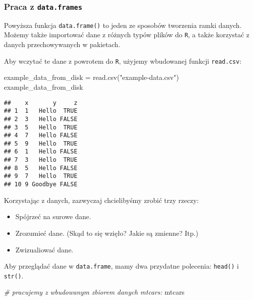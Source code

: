 \documentclass[
]{article}
\newenvironment{Shaded}{\begin{snugshade}}{\end{snugshade}}
\newcommand{\CommentTok}[1]{\textcolor[rgb]{0.56,0.35,0.01}{\textit{#1}}}
\newcommand{\FunctionTok}[1]{\textcolor[rgb]{0.00,0.00,0.00}{#1}}
\newcommand{\NormalTok}[1]{#1}
\newcommand{\OtherTok}[1]{\textcolor[rgb]{0.56,0.35,0.01}{#1}}
\newcommand{\StringTok}[1]{\textcolor[rgb]{0.31,0.60,0.02}{#1}}
\providecommand{\tightlist}{%
  \setlength{\itemsep}{0pt}\setlength{\parskip}{0pt}}
\begin{document}
\hypertarget{praca-z-data.frames}{%
\subsubsection{\texorpdfstring{Praca z
\texttt{data.frames}}{Praca z data.frames}}\label{praca-z-data.frames}}

Powyższa funkcja \texttt{data.frame()} to jeden ze sposobów tworzenia
ramki danych. Możemy także importować dane z różnych typów plików do
\texttt{R}, a także korzystać z danych przechowywanych w pakietach.

Aby wczytać te dane z powrotem do \texttt{R}, użyjemy wbudowanej funkcji
\texttt{read.csv}:

\begin{Shaded}
\begin{Highlighting}[]
\NormalTok{example\_data\_from\_disk }\OtherTok{=} \FunctionTok{read.csv}\NormalTok{(}\StringTok{"example{-}data.csv"}\NormalTok{)}
\NormalTok{example\_data\_from\_disk}
\end{Highlighting}
\end{Shaded}

\begin{verbatim}
##    x       y     z
## 1  1   Hello  TRUE
## 2  3   Hello FALSE
## 3  5   Hello  TRUE
## 4  7   Hello FALSE
## 5  9   Hello  TRUE
## 6  1   Hello FALSE
## 7  3   Hello  TRUE
## 8  5   Hello FALSE
## 9  7   Hello  TRUE
## 10 9 Goodbye FALSE
\end{verbatim}

Korzystając z danych, zazwyczaj chcielibyśmy zrobić trzy rzeczy:

\begin{itemize}
\tightlist
\item
  Spójrzeć na surowe dane.
\item
  Zrozumieć dane. (Skąd to się wzięło? Jakie są zmienne? Itp.)
\item
  Zwizualiować dane.
\end{itemize}

Aby przeglądać dane w \texttt{data.frame}, mamy dwa przydatne polecenia:
\texttt{head()} i \texttt{str()}.

\begin{Shaded}
\begin{Highlighting}[]
\CommentTok{\# pracujemy z wbudowanym zbiorem danych mtcars:}
\NormalTok{mtcars}
\end{Highlighting}
\end{Shaded}
\end{document}
